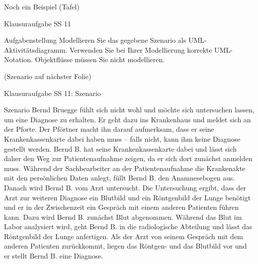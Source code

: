 \documentclass[18pt]{beamer}
\begin{document}
	\begin{frame}{Noch ein Beispiel}
	 	(Tafel)
\end{frame}

	\begin{frame}{Klausuraufgabe SS 11}
	\begin{exampleblock}{Aufgabenstellung}
		Modellieren Sie das gegebene Szenario als UML-Aktivitätsdiagramm. Verwenden Sie bei Ihrer
		Modellierung korrekte UML-Notation. Objektflüsse müssen Sie nicht modellieren. 
	\end{exampleblock}
	(Szenario auf nächster Folie)
\end{frame}

\begin{frame}{Klausuraufgabe SS 11: Szenario}
\begin{block}{Szenario}
	\small Bernd Bruegge fühlt sich nicht wohl und möchte sich untersuchen lassen, um eine Diagnose zu erhalten. Er geht dazu ins Krankenhaus und meldet sich an der Pforte. Der
	Pförtner macht ihn darauf aufmerksam, dass er seine Krankenkassenkarte dabei haben
	muss – falls nicht, kann ihm keine Diagnose gestellt werden. Bernd B. hat seine Krankenkassenkarte dabei und lässt sich daher den Weg zur Patientenaufnahme zeigen, da
	er sich dort zunächst anmelden muss. Während der Sachbearbeiter an der Patientenaufnahme die Krankenakte mit den persönlichen Daten anlegt, füllt Bernd B. den
	Anamnesebogen aus. Danach wird Bernd B. vom Arzt untersucht. Die Untersuchung
	ergibt, dass der Arzt zur weiteren Diagnose ein Blutbild und ein Röntgenbild der Lunge
	benötigt und er in der Zwischenzeit ein Gespräch mit einem anderen Patienten führen
	kann. Dazu wird Bernd B. zunächst Blut abgenommen. Während das Blut im Labor
	analysiert wird, geht Bernd B. in die radiologische Abteilung und lässt das Röntgenbild
	der Lunge anfertigen. Als der Arzt von seinem Gespräch mit dem anderen Patienten zurückkommt, liegen das Röntgen- und das Blutbild vor und er stellt Bernd B. eine Diagnose.
\end{block}
\end{frame}
\end{document}

